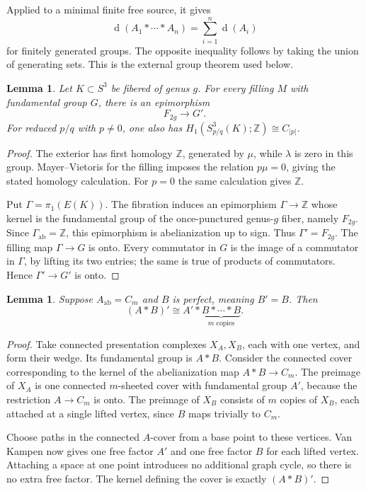 \documentclass[11pt]{article}
\newtheorem{lemma}[theorem]{Lemma}
\theoremstyle{remark}
\newcommand{\Z}{\mathbb Z}
\newcommand{\ab}{\mathrm{ab}}
\newcommand{\gen}{\operatorname{d}}
\begin{document}
Applied to a minimal finite free source, it gives
\begin{equation}\label{eq:grushko}
 \gen(A_1*\cdots*A_n)=\sum_{i=1}^n\gen(A_i)
\end{equation}
for finitely generated groups.
The opposite inequality follows by taking the union of generating sets. This is the external group theorem used below.

\begin{lemma}\label{lem:fiber}
Let $K\subset S^3$ be fibered of genus $g$. For every filling $M$ with fundamental group $G$, there is an epimorphism
\[
 F_{2g}\longrightarrow G'.
\]
For reduced $p/q$ with $p\ne0$, one also has $H_1(S^3_{p/q}(K);\Z)\cong C_{|p|}$.
\end{lemma}

\begin{proof}
The exterior has first homology $\Z$, generated by $\mu$, while $\lambda$ is zero in this group. Mayer--Vietoris for the filling imposes the relation $p\mu=0$, giving the stated homology calculation. For $p=0$ the same calculation gives $\Z$.


Put $\Gamma=\pi_1(E(K))$. The fibration induces an epimorphism $\Gamma\to\Z$ whose kernel is the fundamental group of the once-punctured genus-$g$ fiber, namely $F_{2g}$. Since $\Gamma_{\ab}=\Z$, this epimorphism is abelianization up to sign. Thus $\Gamma'=F_{2g}$. The filling map $\Gamma\to G$ is onto. Every commutator in $G$ is the image of a commutator in $\Gamma$, by lifting its two entries; the same is true of products of commutators. Hence $\Gamma'\to G'$ is onto.
\end{proof}

\begin{lemma}\label{lem:perfect-cover}
Suppose $A_{\ab}=C_m$ and $B$ is perfect, meaning $B'=B$. Then
\[
 (A*B)'\cong A'*\underbrace{B*\cdots*B}_{m\text{ copies}}.
\]
\end{lemma}
\begin{proof}
Take connected presentation complexes $X_A,X_B$, each with one vertex, and form their wedge. Its fundamental group is $A*B$. Consider the connected cover corresponding to the kernel of the abelianization map $A*B\to C_m$. The preimage of $X_A$ is one connected $m$-sheeted cover with fundamental group $A'$, because the restriction $A\to C_m$ is onto. The preimage of $X_B$ consists of $m$ copies of $X_B$, each attached at a single lifted vertex, since $B$ maps trivially to $C_m$.

Choose paths in the connected $A$-cover from a base point to these vertices. Van Kampen now gives one free factor $A'$ and one free factor $B$ for each lifted vertex. Attaching a space at one point introduces no additional graph cycle, so there is no extra free factor. The kernel defining the cover is exactly $(A*B)'$.
\end{proof}
\end{document}
